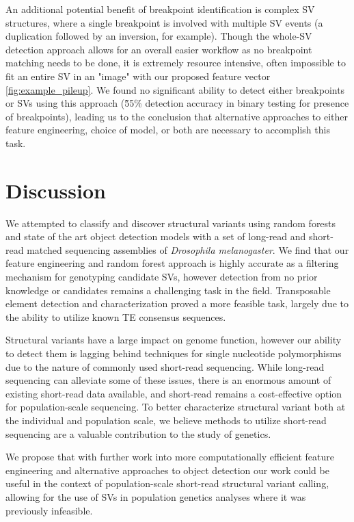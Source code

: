 An additional potential benefit of breakpoint identification is complex SV structures, where a single breakpoint is involved with multiple SV events (a duplication followed by an inversion, for example). Though the whole-SV detection approach allows for an overall easier workflow as no breakpoint matching needs to be done, it is extremely resource intensive, often impossible to fit an entire SV in an "image" with our proposed feature vector \ref{fig:example_pileup}. We found no significant ability to detect either breakpoints or SVs using this approach (\~55\% detection accuracy in binary testing for presence of breakpoints), leading us to the conclusion that alternative approaches to either feature engineering, choice of model, or both are necessary to accomplish this task. 

\section{Discussion}

We attempted to classify and discover structural variants using random forests and state of the art object detection models with a set of long-read and short-read matched sequencing assemblies of \textit{Drosophila melanogaster}. We find that our feature engineering and random forest approach is highly accurate as a filtering mechanism for genotyping candidate SVs, however detection from no prior knowledge or candidates remains a challenging task in the field. Transposable element detection and characterization proved a more feasible task, largely due to the ability to utilize known TE consensus sequences.

Structural variants have a large impact on genome function, however our ability to detect them is lagging behind techniques for single nucleotide polymorphisms due to the nature of commonly used short-read sequencing. While long-read sequencing can alleviate some of these issues, there is an enormous amount of existing short-read data available, and short-read remains a cost-effective option for population-scale sequencing. To better characterize structural variant both at the individual and population scale, we believe methods to utilize short-read sequencing are a valuable contribution to the study of genetics.

We propose that with further work into more computationally efficient feature engineering and alternative approaches to object detection our work could be useful in the context of population-scale short-read structural variant calling, allowing for the use of SVs in population genetics analyses where it was previously infeasible.